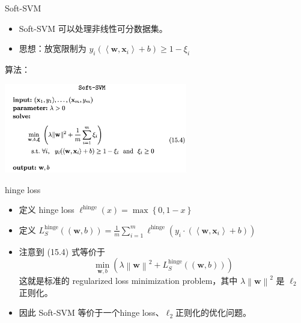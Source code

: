 \begin{frame}[fragile]{Soft-SVM}
    \begin{itemize}
        \item Soft-SVM 可以处理非线性可分数据集。
        \item 思想：放宽限制为 $y_i (\left\langle \mathbf{w}, \mathbf{x}_i \right\rangle + b) \geqslant 1-\xi_i$
    \end{itemize}
    算法：
    \begin{center}
        \includegraphics[width=0.6\textwidth]{assets/ssvm.png}
    \end{center}
    
\end{frame}

\begin{frame}[fragile]{hinge loss}
    \begin{itemize}
        \item 定义 hinge loss $\ell^{\text{hinge}}(x) =\max \left\{ 0, 1-x \right\}  $
        \item 定义 $L_S^{\text{hinge}}((\mathbf{w}, b)) = \frac{1}{m}\sum_{i=1}^{m} \ell^{\text{hinge}}(y_i\cdot(\left\langle \mathbf{w}, \mathbf{x}_i \right\rangle + b))$
        \item 注意到 (15.4) 式等价于
        \[
           \min_{\mathbf{w}, b} \left( \lambda \left\| \mathbf{w} \right\|^{2} + L_S^{\text{hinge}}((\mathbf{w}, b))  \right) 
        \]
        这就是标准的 regularized loss minimization problem，其中 $\lambda \left\| \mathbf{w} \right\|^{2}$ 是 $\ell_2$ 正则化。
        \item 因此 Soft-SVM 等价于一个hinge loss、$\ell_2$正则化的优化问题。
    \end{itemize}
\end{frame}

